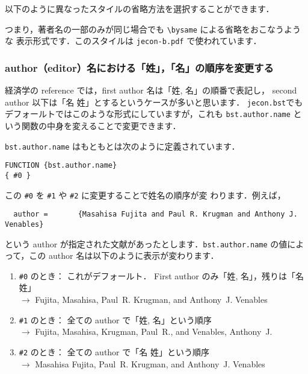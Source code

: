 \documentclass[a4j,10pt]{jarticle}
\newcommand{\bysameline}{\hskip.3em \leavevmode\rule[.5ex]{3em}{.3pt}\hskip0.5em}
\begin{document}
以下のように異なったスタイルの省略方法を選択することができます．
\begin{screen}
\end{screen}
つまり，著者名の一部のみが同じ場合でも \verb|\bysame| による省略をおこなうような
表示形式です．このスタイルは \verb|jecon-b.pdf| で使われています．



\vspace*{1em}

\subsubsection{author（editor）名における「姓」，「名」の順序を変更する}

経済学の reference では，first author 名は「姓, 名」の順番で表記し，
second author 以下は「名 姓」とするというケースが多いと思います． 
\texttt{jecon.bst}でもデフォールトではこのような形式にしていますが，これも 
\texttt{bst.author.name} という関数の中身を変えることで変更できます．

\texttt{bst.author.name} はもともとは次のように定義されています．
\begin{screen}
\begin{verbatim}
FUNCTION {bst.author.name}
{ #0 }
\end{verbatim}
\end{screen}
この \verb|#0| を \verb|#1| や \verb|#2| に変更することで姓名の順序が変
わります．例えば，
\begin{verbatim}
  author =       {Masahisa Fujita and Paul R. Krugman and Anthony J. Venables}
\end{verbatim}
という author が指定された文献があったとします．\texttt{bst.author.name} 
の値によって，この author 名は以下のように表示が変わります．
\begin{enumerate}
 \item \verb|#0| のとき： これがデフォールト． First author のみ「姓, 
       名」，残りは「名 姓」\\
       $\rightarrow$ Fujita, Masahisa, Paul~R. Krugman, and
       Anthony~J. Venables
 \item \verb|#1| のとき： 全ての author で「姓, 名」という順序\\
       $\rightarrow$ Fujita, Masahisa, Krugman, Paul~R., and Venables, Anthony~J.
 \item \verb|#2| のとき： 全ての author で「名 姓」という順序\\
       $\rightarrow$ Masahisa Fujita, Paul~R. Krugman, and Anthony~J. Venables
\end{enumerate}
\end{document}
